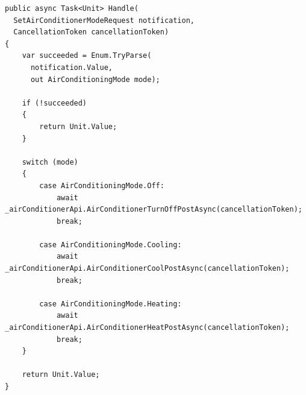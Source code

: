 \begin{lstlisting}[language={[Sharp]C},caption={Implementación de los efectores del aire acondicionado. Invocan a los endpoints HTTP en base a las acciones de adaptación.},captionpos=b, label=ls:effector-airconditioner-set-parameter]
public async Task<Unit> Handle(
  SetAirConditionerModeRequest notification,
  CancellationToken cancellationToken)
{
    var succeeded = Enum.TryParse(
      notification.Value,
      out AirConditioningMode mode);

    if (!succeeded)
    {
        return Unit.Value;
    }

    switch (mode)
    {
        case AirConditioningMode.Off:
            await _airConditionerApi.AirConditionerTurnOffPostAsync(cancellationToken);
            break;

        case AirConditioningMode.Cooling:
            await _airConditionerApi.AirConditionerCoolPostAsync(cancellationToken);
            break;

        case AirConditioningMode.Heating:
            await _airConditionerApi.AirConditionerHeatPostAsync(cancellationToken);
            break;
    }

    return Unit.Value;
}
\end{lstlisting}
